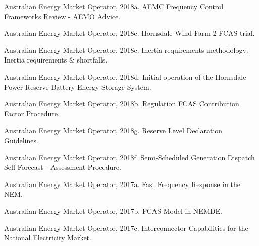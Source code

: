 \documentclass[12pt,a4paper,]{report}
\newlength{\cslhangindent}
\newenvironment{CSLReferences}[2] %
 {%
  \setlength{\parindent}{0pt}
  \ifodd #1 \everypar{\setlength{\hangindent}{\cslhangindent}}\ignorespaces\fi
  \ifnum #2 > 0
  \setlength{\parskip}{#2\baselineskip}
  \fi
 }%
 {}
\begin{document}
\begin{CSLReferences}{1}{0}
\leavevmode{}%
Australian Energy Market Operator, 2018a.
\href{https://www.aemc.gov.au/sites/default/files/2018-03/Advice\%20from\%20AEMO\%20-\%20Primary\%20frequency\%20control.PDF}{{AEMC
Frequency Control Frameworks Review} - {AEMO Advice}}.

\leavevmode{}%
Australian Energy Market Operator, 2018e. Hornsdale {Wind Farm} 2 {FCAS}
trial.

\leavevmode{}%
Australian Energy Market Operator, 2018c. Inertia requirements
methodology: Inertia requirements \& shortfalls.

\leavevmode{}%
Australian Energy Market Operator, 2018d. Initial operation of the
{Hornsdale Power Reserve Battery Energy Storage System}.

\leavevmode{}%
Australian Energy Market Operator, 2018b. Regulation {FCAS Contribution
Factor Procedure}.

\leavevmode{}%
Australian Energy Market Operator, 2018g.
\href{https://www.aemo.com.au/-/media/files/electricity/nem/security_and_reliability/power_system_ops/reserve-level-declaration-guidelines.pdf?la=en}{Reserve
{Level Declaration Guidelines}}.

\leavevmode{}%
Australian Energy Market Operator, 2018f. Semi-{Scheduled Generation
Dispatch Self-Forecast} - {Assessment Procedure}.

\leavevmode{}%
Australian Energy Market Operator, 2017a. Fast {Frequency Response} in
the {NEM}.

\leavevmode{}%
Australian Energy Market Operator, 2017b. {FCAS Model} in {NEMDE}.

\leavevmode{}%
Australian Energy Market Operator, 2017c. Interconnector {Capabilities}
for the {National Electricity Market}.


\end{CSLReferences}
\end{document}
